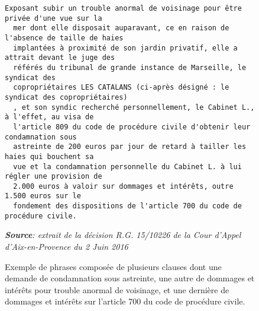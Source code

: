 \begin{figure}[!htb]
\begin{Verbatim}[firstnumber=69]
  Exposant subir un trouble anormal de voisinage pour être privée d'une vue sur la 
  mer dont elle disposait auparavant, ce en raison de l'absence de taille de haies 
  implantées à proximité de son jardin privatif, elle a attrait devant le juge des 
  référés du tribunal de grande instance de Marseille, le syndicat des 
  copropriétaires LES CATALANS (ci-après désigné : le syndicat des copropriétaires) 
  , et son syndic recherché personnellement, le Cabinet L., à l'effet, au visa de 
  l'article 809 du code de procédure civile d'obtenir leur condamnation sous 
  astreinte de 200 euros par jour de retard à tailler les haies qui bouchent sa 
  vue et la condamnation personnelle du Cabinet L. à lui régler une provision de 
  2.000 euros à valoir sur dommages et intérêts, outre 1.500 euros sur le 
  fondement des dispositions de l'article 700 du code de procédure civile.
\end{Verbatim}
\scriptsize{\textit{\textbf{Source}: extrait de la décision R.G. 15/10226 de la Cour d'Appel d'Aix-en-Provence du 2 Juin 2016}}
  \caption{Exemple de phrases composée de plusieurs clauses dont une demande de condamnation sous astreinte, une autre de dommages et intérêts pour trouble anormal de voisinage, et une dernière de dommages et intérêts sur l'article 700 du code de procédure civile.}
  \label{fig:intro:multiclauses}
\end{figure}


